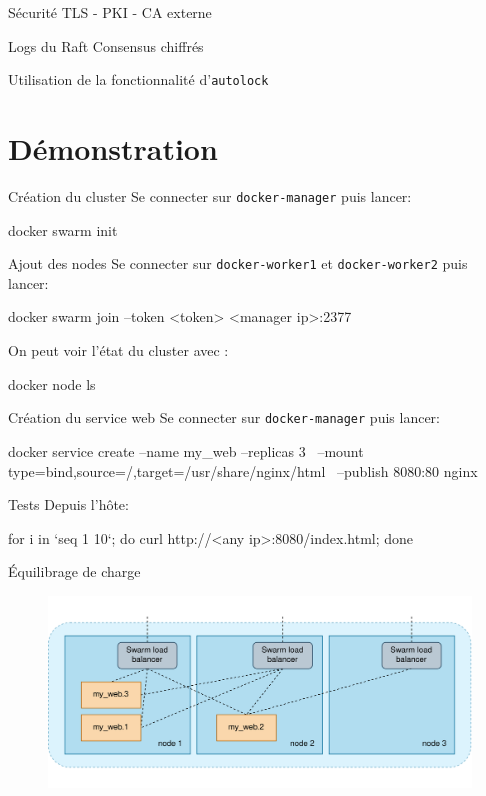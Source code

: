 \documentclass{cubeamer}
\begin{document}
\begin{frame}{Sécurité}
TLS - PKI - CA externe

Logs du Raft Consensus chiffrés

Utilisation de la fonctionnalité d'\verb:autolock:
\end{frame}

\section{Démonstration}

\begin{frame}[fragile]{Création du cluster}
Se connecter sur \verb:docker-manager: puis lancer:
\begin{bash}
docker swarm init
\end{bash}
\end{frame}

\begin{frame}[fragile]{Ajout des nodes}
Se connecter sur \verb:docker-worker1: et \verb:docker-worker2: puis lancer:
\begin{bash}
docker swarm join --token <token> <manager ip>:2377
\end{bash}

On peut voir l'état du cluster avec :
\begin{bash}
docker node ls
\end{bash}
\end{frame}

\begin{frame}[fragile]{Création du service web}
Se connecter sur \verb:docker-manager: puis lancer:
\begin{bash}
docker service create --name my_web --replicas 3 \
    --mount type=bind,source=/,target=/usr/share/nginx/html \
    --publish 8080:80 nginx
\end{bash}
\end{frame}

\begin{frame}[fragile]{Tests}
Depuis l'hôte:
\begin{bash}
for i in `seq 1 10`; do curl http://<any ip>:8080/index.html; done
\end{bash}
\end{frame}

\begin{frame}{Équilibrage de charge}
    \begin{figure}
        \centering
        \includegraphics[width=\textwidth]{img/routing-mesh}
    \end{figure}
\end{frame}
\end{document}
